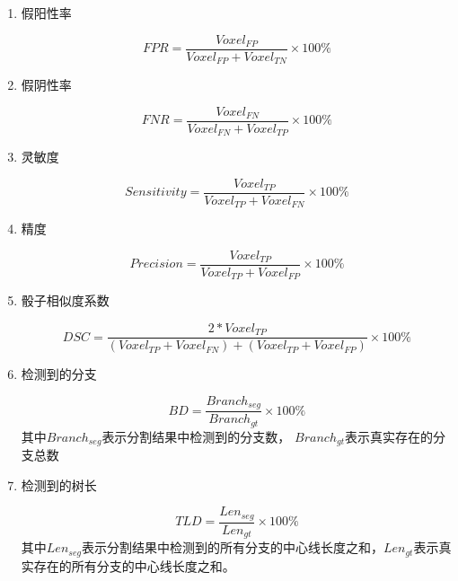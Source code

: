 \begin{enumerate}
    \item 假阳性率
    
    \begin{equation}
        FPR = \frac{{Voxel}_{FP}}{{Voxel}_{FP} + {Voxel}_{TN}} \times 100\%
    \end{equation}
    
    \item 假阴性率
    
    \begin{equation}
        FNR = \frac{{Voxel}_{FN}}{{Voxel}_{FN} + {Voxel}_{TP}} \times 100\%
    \end{equation}
    
    \item 灵敏度
    
    \begin{equation}
        Sensitivity = \frac{{Voxel}_{TP}}{{Voxel}_{TP} + {Voxel}_{FN}} \times 100\%
    \end{equation}
    
    \item 精度
    
    \begin{equation}
        Precision = \frac{{Voxel}_{TP}}{{Voxel}_{TP} + {Voxel}_{FP}} \times 100\%
    \end{equation}
    
    \item 骰子相似度系数
    
    \begin{equation}
        DSC = \frac{2 * {Voxel}_{TP}}{({Voxel}_{TP} + {Voxel}_{FN}) + ({Voxel}_{TP} + {Voxel}_{FP})} \times 100\%
    \end{equation}
    
    \item 检测到的分支
    
    \begin{equation}
        BD = \frac{{Branch}_{seg}}{{Branch}_{gt}} \times 100\%
    \end{equation}
    其中${Branch}_{seg}$表示分割结果中检测到的分支数， ${Branch}_{gt}$表示真实存在的分支总数
    
    \item 检测到的树长
    
    \begin{equation}
        TLD = \frac{{Len}_{seg}}{{Len}_{gt}} \times 100\%
    \end{equation}
    其中${Len}_{seg}$表示分割结果中检测到的所有分支的中心线长度之和，${Len}_{gt}$表示真实存在的所有分支的中心线长度之和。
\end{enumerate}

